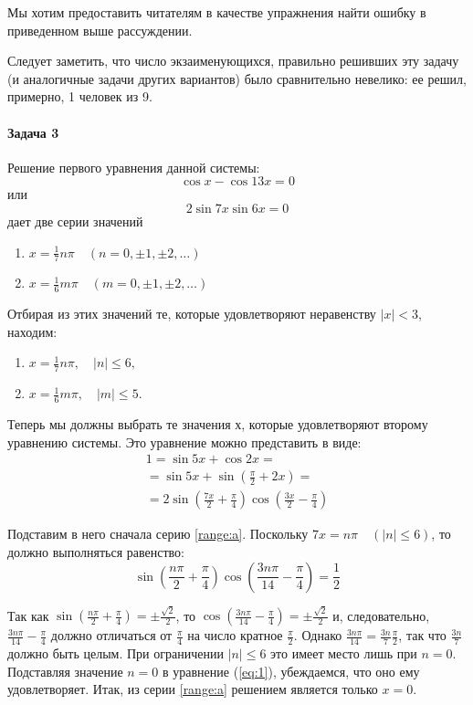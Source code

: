 \documentclass[14pt]{extarticle}
\begin{document}
Мы хотим предоставить читателям в качестве упражнения найти ошибку в приведенном выше рассуждении.

Следует заметить, что число экзаименующихся, правильно решивших эту задачу (и аналогичные задачи других вариантов) было сравнительно невелико: ее решил, примерно, 1 человек из 9.
\paragraph{Задача 3}

Решение первого уравнения данной системы:
\[\cos x - \cos 13x = 0\]
или
\[2\sin 7x \sin 6x = 0\]
дает две серии значений
\begin{enumerate}[label=\alph*)]
    \item \(x=\frac{1}{7}n\pi \quad (n=0, \pm1, \pm2,\dots)\) \label{range:a}
    \item \(x=\frac{1}{6}m\pi \quad (m=0, \pm1, \pm2,\dots)\) \label{range:b}
\end{enumerate}

Отбирая из этих значений те, которые удовлетворяют неравенству \(|x| < 3\), находим:
\begin{enumerate}[label=\alph*)]
    \item \(x = \frac{1}{7} n \pi, \quad |n| \leq 6,\)
    \item \(x = \frac{1}{6} m \pi, \quad |m| \leq 5.\)
\end{enumerate}

Теперь мы должны выбрать те значения х, которые удовлетворяют второму уравнению системы. Это уравнение можно представить в виде:
\begin{align*}
1 =\sin 5x + \cos 2x =\\
=\sin 5x + \sin\left(\frac{\pi}{2} + 2x\right) =\\
=2\sin\left(\frac{7x}{2} + \frac{\pi}{4}\right)\cos\left(\frac{3x}{2} - \frac{\pi}{4}\right)
\end{align*}                

Подставим в него сначала серию \ref{range:a}. Поскольку \(7x =n\pi \quad(|n| \leq 6)\), то должно выполняться равенство:
\begin{equation}\label{eq:1}
\sin\left(\frac{n\pi}{2}+\frac{\pi}{4}\right)\cos\left(\frac{3n\pi}{14}-\frac{\pi}{4}\right)=\frac{1}{2}
\end{equation}
 
Так как \(\sin\left(\frac{n\pi}{2}+\frac{\pi}{4}\right) = \pm\frac{\sqrt{2}}{2}\), то    \(\cos\left(\frac{3n\pi}{14}-\frac{\pi}{4}\right)=\pm\frac{\sqrt{2}}{2}\) и, следовательно, \(\frac{3n\pi}{14}-\frac{\pi}{4}\) должно отличаться от \(\frac{\pi}{4}\) на число кратное \(\frac{\pi}{2}\). Однако \(\frac{3n\pi}{14}=\frac{3n}{7}\frac{\pi}{2}\), так что \(\frac{3n}{7}\) должно быть целым. При ограничении \(|n| \leq 6\) это имеет место лишь при \(n=0\). Подставляя значение \(n=0\) в уравнение (\ref{eq:1}), убеждаемся, что оно ему удовлетворяет. Итак, из серии \ref{range:a} решением является только \(x=0\).
\end{document}
